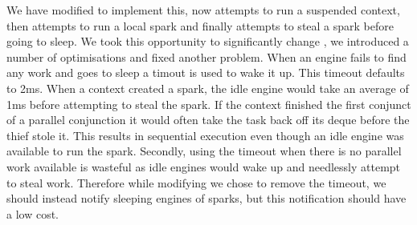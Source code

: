 We have modified \getglobalwork to implement this,
now \getglobalwork attempts to run a suspended context,
then attempts to run a local spark and finally attempts to steal a spark
before going to sleep.
We took this opportunity to significantly change \getglobalwork,
we introduced a number of optimisations and fixed another problem.
When an engine fails to find any work and goes to sleep a timout is used to
wake it up.
This timeout defaults to 2ms.
When a context created a spark,
the idle engine would take an average of 1ms before attempting to steal the
spark.
If the context finished the first conjunct of a parallel conjunction it
would often take the task back off its deque before the thief stole it.
This results in sequential execution even though an idle engine was
available to run the spark.
Secondly,
using the timeout when there is no parallel work available is wasteful
as idle engines would wake up and needlessly attempt to steal work.
Therefore while modifying \getglobalwork we chose to remove the timeout,
we should instead notify sleeping engines of sparks, but this notification
should have a low cost.


